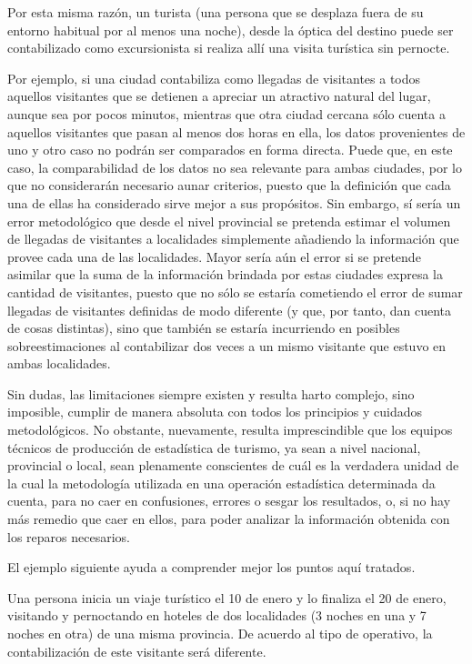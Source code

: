 \documentclass[
  openany]{book}
\begin{document}
Por esta misma razón, un turista (una persona que se desplaza fuera de su entorno habitual por al menos una noche), desde la óptica del destino puede ser contabilizado como excursionista si realiza allí una visita turística sin pernocte.

Por ejemplo, si una ciudad contabiliza como llegadas de visitantes a todos aquellos visitantes que se detienen a apreciar un atractivo natural del lugar, aunque sea por pocos minutos, mientras que otra ciudad cercana sólo cuenta a aquellos visitantes que pasan al menos dos horas en ella, los datos provenientes de uno y otro caso no podrán ser comparados en forma directa. Puede que, en este caso, la comparabilidad de los datos no sea relevante para ambas ciudades, por lo que no considerarán necesario aunar criterios, puesto que la definición que cada una de ellas ha considerado sirve mejor a sus propósitos. Sin embargo, sí sería un error metodológico que desde el nivel provincial se pretenda estimar el volumen de llegadas de visitantes a localidades simplemente añadiendo la información que provee cada una de las localidades. Mayor sería aún el error si se pretende asimilar que la suma de la información brindada por estas ciudades expresa la cantidad de visitantes, puesto que no sólo se estaría cometiendo el error de sumar llegadas de visitantes definidas de modo diferente (y que, por tanto, dan cuenta de cosas distintas), sino que también se estaría incurriendo en posibles sobreestimaciones al contabilizar dos veces a un mismo visitante que estuvo en ambas localidades.

Sin dudas, las limitaciones siempre existen y resulta harto complejo, sino imposible, cumplir de manera absoluta con todos los principios y cuidados metodológicos. No obstante, nuevamente, resulta imprescindible que los equipos técnicos de producción de estadística de turismo, ya sean a nivel nacional, provincial o local, sean plenamente conscientes de cuál es la verdadera unidad de la cual la metodología utilizada en una operación estadística determinada da cuenta, para no caer en confusiones, errores o sesgar los resultados, o, si no hay más remedio que caer en ellos, para poder analizar la información obtenida con los reparos necesarios.

El ejemplo siguiente ayuda a comprender mejor los puntos aquí tratados.

Una persona inicia un viaje turístico el 10 de enero y lo finaliza el 20 de enero, visitando y pernoctando en hoteles de dos localidades (3 noches en una y 7 noches en otra) de una misma provincia. De acuerdo al tipo de operativo, la contabilización de este visitante será diferente.
\end{document}
